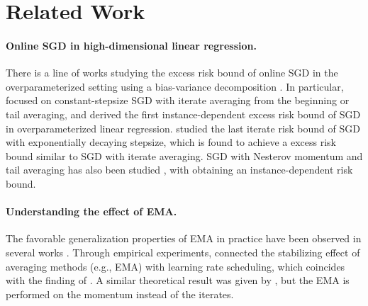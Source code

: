 \section{Related Work}
\paragraph{Online SGD in high-dimensional linear regression.}
There is a line of works studying the excess risk bound of online SGD in the overparameterized setting using a bias-variance decomposition \citep{bach2013non, dieuleveut2015non, defossez2015averaged, dieulevuet2017harder, lakshminarayanan2018linear, jain2018parallelizing, berthier2020tight, zou2021benign, wu2022last, lin2024scaling}.
In particular, \citet{zou2021benign} focused on constant-stepsize SGD with iterate averaging from the beginning or tail averaging, and derived the first instance-dependent excess risk bound of SGD in overparameterized linear regression.
\citet{wu2022last} studied the last iterate risk bound of SGD with exponentially decaying stepsize, which is found to achieve a excess risk bound similar to SGD with iterate averaging.
SGD with Nesterov momentum \citep{nesterov2013introductory} and tail averaging has also been studied \citep{jain2018accelerating, varre2022accelerated, li2023risk}, with \citet{li2023risk} obtaining an instance-dependent risk bound.

\paragraph{Understanding the effect of EMA.}
The favorable generalization properties of EMA in practice have been observed in several works \citep{tarvainen2017mean, izmailov2018averaging}.
Through empirical experiments, \citet{sandler2023training} connected the stabilizing effect of averaging methods (e.g., EMA) with learning rate scheduling, which coincides with the finding of \citet{wu2022last}.
A similar theoretical result was given by \citet{defazio2020momentum}, but the EMA is performed on the momentum instead of the iterates.